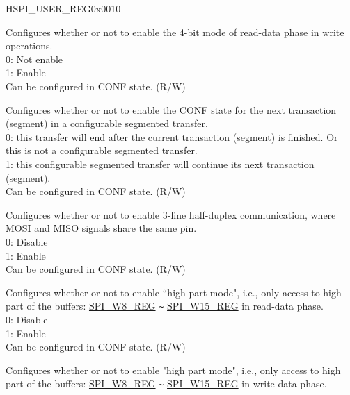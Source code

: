 \addtocounter{Regfloat}{-1}
\begin{register}{H}{SPI\_USER\_REG}{0x0010}
\begin{regdesc}\begin{reglist}
\item [Continued from the previous page...]

\label{fielddesc:SPIFWRITEQUAD}\item [SPI\_FWRITE\_QUAD] Configures whether or not to enable the 4-bit mode of read-data phase in write operations. \\
0: Not enable \\
1: Enable \\
Can be configured in CONF state. (R/W)
\label{fielddesc:SPIUSRCONFNXT}\item [SPI\_USR\_CONF\_NXT] Configures whether or not to enable the CONF state for the next transaction (segment) in a configurable segmented transfer. \\
0: this transfer will end after the current transaction (segment) is finished. Or this is not a configurable segmented transfer. \\
1: this configurable segmented transfer will continue its next transaction (segment). \\
Can be configured in CONF state. (R/W)
\label{fielddesc:SPISIO}\item [SPI\_SIO] Configures whether or not to enable 3-line half-duplex communication, where MOSI and MISO signals share the same pin. \\
0: Disable \\
1: Enable \\
Can be configured in CONF state. (R/W)
\label{fielddesc:SPIUSRMISOHIGHPART}\item [SPI\_USR\_MISO\_HIGHPART] Configures whether or not to enable ``high part mode", i.e., only access to high part of the buffers: \hyperref[regdesc:SPIW0REG]{SPI\_W8\_REG} \verb+~+ \hyperref[regdesc:SPIW0REG]{SPI\_W15\_REG} in read-data phase. \\
0: Disable \\
1: Enable \\
Can be configured in CONF state. (R/W)
\label{fielddesc:SPIUSRMOSIHIGHPART}\item [SPI\_USR\_MOSI\_HIGHPART] Configures whether or not to enable "high part mode", i.e., only access to high part of the buffers: \hyperref[regdesc:SPIW0REG]{SPI\_W8\_REG} \verb+~+ \hyperref[regdesc:SPIW0REG]{SPI\_W15\_REG} in write-data phase. \\

\end{reglist}
\end{regdesc}
\end{register}
